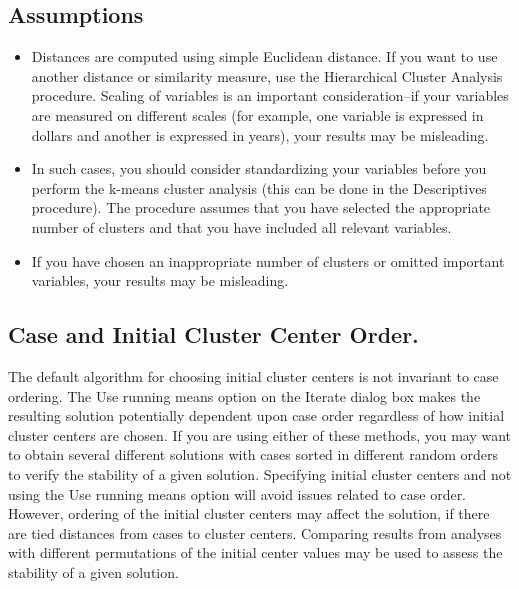 \documentclass[a4paper,12pt]{article}
\begin{document}
\subsection*{Assumptions}
\begin{itemize}
	\item  Distances are computed using simple Euclidean distance. If you want to use another distance or similarity measure, use the Hierarchical Cluster Analysis procedure. Scaling of variables is an important consideration--if your variables are measured on different scales (for example, one variable is expressed in dollars and another is expressed in years), your results may be misleading.
	\item  In such cases, you should consider standardizing your variables before you perform the k-means cluster analysis (this can be done in the Descriptives procedure). The procedure assumes that you have selected the appropriate number of clusters and that you have included all relevant variables. 
	\item If you have chosen an inappropriate number of clusters or omitted important variables, your results may be misleading.
\end{itemize}


\subsection*{Case and Initial Cluster Center Order.} The default algorithm for choosing initial cluster centers is not invariant to case ordering. The Use running means option on the Iterate dialog box makes the resulting solution potentially dependent upon case order regardless of how initial cluster centers are chosen. If you are using either of these methods, you may want to obtain several different solutions with cases sorted in different random orders to verify the stability of a given solution. Specifying initial cluster centers and not using the Use running means option will avoid issues related to case order. However, ordering of the initial cluster centers may affect the solution, if there are tied distances from cases to cluster centers. Comparing results from analyses with different permutations of the initial center values may be used to assess the stability of a given solution.
\end{document}
